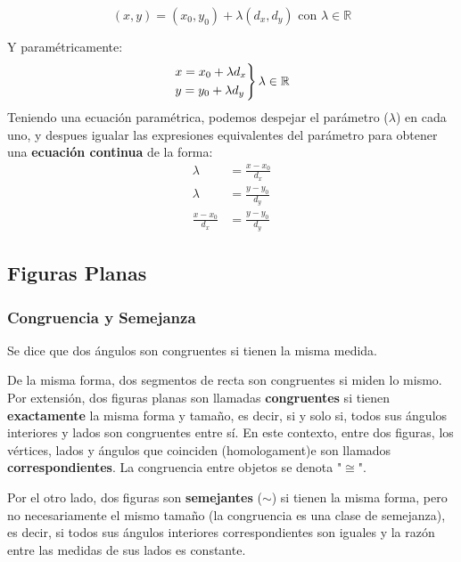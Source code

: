 \begin{equation*}
(x, y) = (x_0, y_0) + \lambda(d_x,d_y) \text{ con } \lambda \in \mathbb{R}
\end{equation*}

Y paramétricamente:
\begin{equation*}
    \begin{rcases}
      x = x_0 + \lambda d_x \\
      y = y_0 + \lambda d_y
    \end{rcases}
    \lambda \in \mathbb{R}
    \end{equation*}
Teniendo una ecuación paramétrica, podemos despejar el parámetro ($\lambda$) en cada uno, y despues igualar las expresiones equivalentes del parámetro para obtener una \textbf{ecuación continua} de la forma:
\begin{equation*}
\begin{split}
    \lambda &= \frac{x - x_0}{d_x}\\
    \lambda &= \frac{y - y_0}{d_y}\\
    \frac{x-x_0}{d_x} &= \frac{y-y_0}{d_y}
\end{split}
\end{equation*}
\vfill\null\columnbreak
\subsection{Figuras Planas}
\subsubsection{Congruencia y Semejanza}
Se dice que dos ángulos son congruentes si tienen la misma medida.

De la misma forma, dos segmentos de recta son congruentes si miden lo mismo. \\

Por extensión, dos figuras planas son llamadas \textbf{congruentes} si tienen \textbf{exactamente} la misma forma y tamaño, es decir, si y solo si, todos sus ángulos interiores y lados son congruentes entre sí.
En este contexto, entre dos figuras, los vértices, lados y ángulos que coinciden (homologament)e son llamados \textbf{correspondientes}. La congruencia entre objetos se denota "$\cong$".

Por el otro lado, dos figuras son \textbf{semejantes} ($\sim$) si tienen la misma forma, pero no necesariamente el mismo tamaño (la congruencia es una clase de semejanza), es decir, si todos sus ángulos interiores correspondientes son iguales y la razón entre las medidas de sus lados es constante.\\
